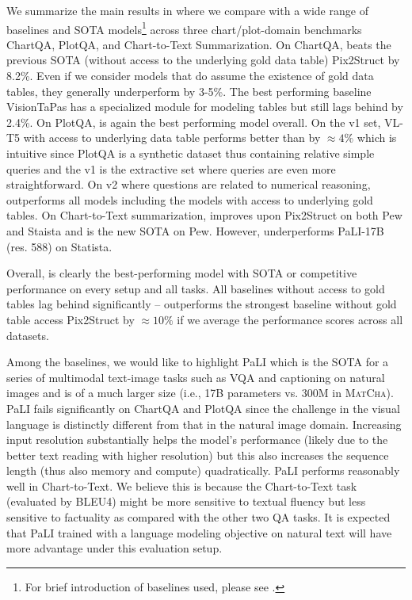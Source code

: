 We summarize the main results in  where we compare \model{} with a wide range of baselines and SOTA models\footnote{For brief introduction of baselines used, please see .} across three chart/plot-domain benchmarks ChartQA, PlotQA, and Chart-to-Text Summarization. On ChartQA, \model{} beats the previous SOTA (without access to the underlying gold data table) Pix2Struct by 8.2\%. Even if we consider models that do assume the existence of gold data tables, they generally underperform \model{} by 3-5\%. The best performing baseline VisionTaPas has a specialized module for modeling tables but still lags behind \model{} by 2.4\%. On PlotQA, \model{} is again the best performing model overall. On the v1 set, VL-T5 with access to underlying data table performs better than \model{} by $\approx4\%$ which is intuitive since PlotQA is a synthetic dataset thus containing relative simple queries and the v1 is the extractive set where queries are even more straightforward. On v2 where questions are related to numerical reasoning, \model{} outperforms all models including the models with access to underlying gold tables.  On Chart-to-Text summarization, \model{} improves upon Pix2Struct on both Pew and Staista and is the new SOTA on Pew. However, \model{} underperforms PaLI-17B (res. 588) on Statista.

Overall, \model{} is clearly the best-performing model with SOTA or competitive performance on every setup and all tasks. %
All baselines without access to gold tables lag behind significantly -- \model{} outperforms the strongest baseline without gold table access Pix2Struct by $\approx10\%$ if we average the performance scores across all datasets.

Among the baselines, we would like to highlight PaLI which is the SOTA for a series of multimodal text-image tasks such as VQA and captioning on natural images and is of a much larger size (i.e., 17B parameters vs. 300M in \textsc{MatCha}). PaLI fails significantly on ChartQA and PlotQA since the challenge in the visual language is distinctly different from that in the natural image domain. Increasing input resolution substantially helps the model's performance (likely due to the better text reading with higher resolution) but this also increases the sequence length (thus also memory and compute) quadratically. PaLI performs reasonably well in Chart-to-Text. We believe this is because the Chart-to-Text task (evaluated by BLEU4) might be more sensitive to textual fluency but less sensitive to factuality as compared with the other two QA tasks. It is expected that PaLI trained with a language modeling objective on natural text will have more advantage under this evaluation setup. 


